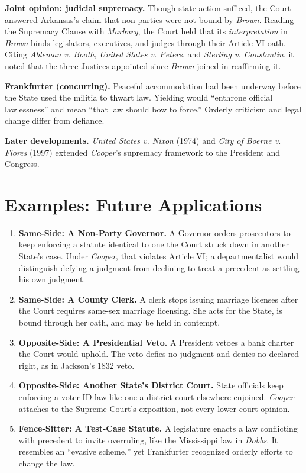 \documentclass[12pt]{article}
\begin{document}
\textbf{Joint opinion: judicial supremacy.} Though state action sufficed, the Court answered Arkansas's claim that non-parties were not bound by \textit{Brown}. Reading the Supremacy Clause with \textit{Marbury}, the Court held that its \emph{interpretation} in \textit{Brown} binds legislators, executives, and judges through their Article VI oath. Citing \textit{Ableman v. Booth}, \textit{United States v. Peters}, and \textit{Sterling v. Constantin}, it noted that the three Justices appointed since \textit{Brown} joined in reaffirming it.

\textbf{Frankfurter (concurring).} Peaceful accommodation had been underway before the State used the militia to thwart law. Yielding would ``enthrone official lawlessness'' and mean ``that law should bow to force.'' Orderly criticism and legal change differ from defiance.

\textbf{Later developments.} \textit{United States v. Nixon} (1974) and \textit{City of Boerne v. Flores} (1997) extended \textit{Cooper}'s supremacy framework to the President and Congress.

\section{Examples: Future Applications}

\begin{enumerate}
\item \textbf{Same-Side: A Non-Party Governor.} A Governor orders prosecutors to keep enforcing a statute identical to one the Court struck down in another State's case. Under \textit{Cooper}, that violates Article VI; a departmentalist would distinguish defying a judgment from declining to treat a precedent as settling his own judgment.
\item \textbf{Same-Side: A County Clerk.} A clerk stops issuing marriage licenses after the Court requires same-sex marriage licensing. She acts for the State, is bound through her oath, and may be held in contempt.
\item \textbf{Opposite-Side: A Presidential Veto.} A President vetoes a bank charter the Court would uphold. The veto defies no judgment and denies no declared right, as in Jackson's 1832 veto.
\item \textbf{Opposite-Side: Another State's District Court.} State officials keep enforcing a voter-ID law like one a district court elsewhere enjoined. \textit{Cooper} attaches to the Supreme Court's exposition, not every lower-court opinion.
\item \textbf{Fence-Sitter: A Test-Case Statute.} A legislature enacts a law conflicting with precedent to invite overruling, like the Mississippi law in \textit{Dobbs}. It resembles an ``evasive scheme,'' yet Frankfurter recognized orderly efforts to change the law.
\end{enumerate}
\end{document}
